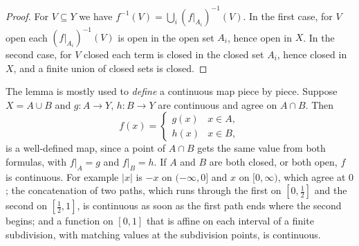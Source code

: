 \begin{proof}
For $V \subseteq Y$ we have $f^{-1}(V) = \bigcup_i (f|_{A_i})^{-1}(V)$. In the first case, for $V$ open each $(f|_{A_i})^{-1}(V)$ is open in the open
set $A_i$, hence open in $X$. In the second case, for $V$ closed each term is closed in the closed set $A_i$, hence closed in $X$, and a finite union of
closed sets is closed.
\end{proof}

The lemma is mostly used to \emph{define} a continuous map piece by piece. Suppose $X = A \cup B$ and $g \colon A \to Y$, $h \colon B \to Y$ are continuous and agree on $A \cap B$. Then
\[
f(x) = \begin{cases} g(x) & x \in A,\\ h(x) & x \in B,\end{cases}
\]
is a well-defined map, since a point of $A \cap B$ gets the same value from both formulas, with $f|_A = g$ and $f|_B = h$. If $A$ and $B$ are both closed, or both open, $f$ is continuous. For example
$|x|$ is $-x$ on $(-\infty, 0]$ and $x$ on $[0, \infty)$, which agree at $0$; the concatenation of two paths, which runs through the first on $[0, \frac12]$ and the second on $[\frac12, 1]$, is continuous as soon as
the first path ends where the second begins; and a function on $[0, 1]$ that is affine on each interval of a finite subdivision, with matching values at the subdivision points, is continuous.

